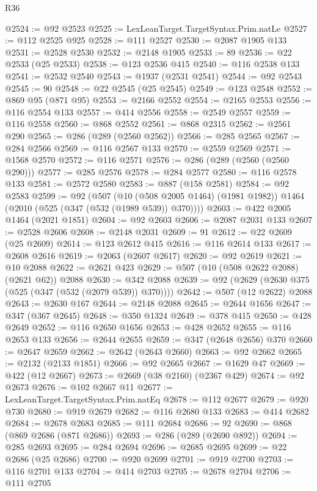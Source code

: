 \begin{lexlean}{R36}
\begin{coremodule}
@2524 := @92 @2523
@2525 := LexLeanTarget.TargetSyntax.Prim.natLe
@2527 := @112 @2525 @925
@2528 := @111 @2527
@2530 := @2087 @1905 @133
@2531 := @2528 @2530
@2532 := @2148 @1905
@2533 := 89
@2536 := @22 @2533 (@25 @2533)
@2538 := @123 @2536 @415
@2540 := @116 @2538 @133
@2541 := @2532 @2540
@2543 := @1937 (@2531 @2541)
@2544 := @92 @2543
@2545 := 90
@2548 := @22 @2545 (@25 @2545)
@2549 := @123 @2548
@2552 := @869 @95 (@871 @95)
@2553 := @2166 @2552
@2554 := @2165 @2553
@2556 := @116 @2554 @133
@2557 := @414 @2556
@2558 := @2549 @2557
@2559 := @116 @2558
@2560 := @868 @2552
@2561 := @868 @2315
@2562 := @2561 @290
@2565 := @286 (@289 (@2560 @2562))
@2566 := @285 @2565
@2567 := @284 @2566
@2569 := @116 @2567 @133
@2570 := @2559 @2569
@2571 := @1568 @2570
@2572 := @116 @2571
@2576 := @286 (@289 (@2560 (@2560 @290)))
@2577 := @285 @2576
@2578 := @284 @2577
@2580 := @116 @2578 @133
@2581 := @2572 @2580
@2583 := @887 (@158 @2581)
@2584 := @92 @2583
@2599 := @92
    (@507
      (@10 (@508 @2005 @1464) (@1981 @1982))
      @1464
      (@2010 (@525 (@347 (@532 (@1989 @539)) @370))))
@2603 := @422 @2005 @1464 (@2021 @1851)
@2604 := @92 @2603
@2606 := @2087 @2031 @133
@2607 := @2528 @2606
@2608 := @2148 @2031
@2609 := 91
@2612 := @22 @2609 (@25 @2609)
@2614 := @123 @2612 @415
@2616 := @116 @2614 @133
@2617 := @2608 @2616
@2619 := @2063 (@2607 @2617)
@2620 := @92 @2619
@2621 := @10 @2088
@2622 := @2621 @423
@2629 := @507 (@10 (@508 @2622 @2088) (@2621 @62)) @2088
@2630 := @342 @2088
@2639 := @92 (@2629 (@2630 @375 (@525 (@347 (@532 (@2079 @539)) @370))))
@2642 := @507 (@12 @2622) @2088
@2643 := @2630 @167
@2644 := @2148 @2088
@2645 := @2644 @1656
@2647 := @347 (@367 @2645)
@2648 := @350 @1324
@2649 := @378 @415
@2650 := @428 @2649
@2652 := @116 @2650 @1656
@2653 := @428 @2652
@2655 := @116 @2653 @133
@2656 := @2644 @2655
@2659 := @347 (@2648 @2656) @370
@2660 := @2647 @2659
@2662 := @2642 (@2643 @2660)
@2663 := @92 @2662
@2665 := @2132 (@2133 @1851)
@2666 := @92 @2665
@2667 := @1629 @47
@2669 := @422 (@12 @2667)
@2673 := @2669 (@38 @2160) (@2367 @429)
@2674 := @92 @2673
@2676 := @102 @2667 @11
@2677 := LexLeanTarget.TargetSyntax.Prim.natEq
@2678 := @112 @2677
@2679 := @920 @730
@2680 := @919 @2679
@2682 := @116 @2680 @133
@2683 := @414 @2682
@2684 := @2678 @2683
@2685 := @111 @2684
@2686 := 92
@2690 := @868 (@869 @2686 (@871 @2686))
@2693 := @286 (@289 (@2690 @892))
@2694 := @285 @2693
@2695 := @284 @2694
@2696 := @2685 @2695
@2699 := @22 @2686 (@25 @2686)
@2700 := @920 @2699
@2701 := @919 @2700
@2703 := @116 @2701 @133
@2704 := @414 @2703
@2705 := @2678 @2704
@2706 := @111 @2705

\end{coremodule}
\end{lexlean}
